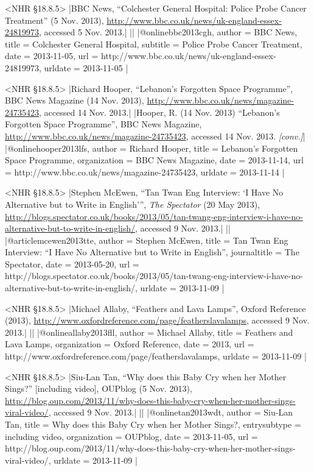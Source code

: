 \documentclass[extrafontsizes,11pt,a4paper,oneside]{memoir}
\begin{document}
\bibexample<NHR \S18.8.5>
|BBC News, \enquote{Colchester General Hospital: Police Probe Cancer Treatment} (5 Nov. 2013), \url{http://www.bbc.co.uk/news/uk-england-essex-24819973}, accessed 5 Nov. 2013.|%
||%
|@online{bbc2013cgh,
  author = {{BBC News}},
  title = {Colchester General Hospital},
  subtitle = {Police Probe Cancer Treatment},
  date = {2013-11-05},
  url = {http://www.bbc.co.uk/news/uk-england-essex-24819973},
  urldate = {2013-11-05}
}|

\bibexample<NHR \S18.8.5>
|Richard Hooper, \enquote{Lebanon's Forgotten Space Programme}, BBC News Magazine (14 Nov. 2013), \url{http://www.bbc.co.uk/news/magazine-24735423}, accessed 14 Nov. 2013.|%
|Hooper, R. (14 Nov. 2013) \enquote{Lebanon's Forgotten Space Programme}, BBC News Magazine, \url{http://www.bbc.co.uk/news/magazine-24735423}, accessed 14 Nov. 2013. \emph{[conv.]}|%
|@online{hooper2013lfs,
  author = {Richard Hooper},
  title = {Lebanon's Forgotten Space Programme},
  organization = {BBC News Magazine},
  date = {2013-11-14},
  url = {http://www.bbc.co.uk/news/magazine-24735423},
  urldate = {2013-11-14}
}|

\bibexample<NHR \S18.8.5>
|Stephen McEwen, \enquote{Tan Twan Eng Interview: \enquote{I Have No Alternative but to Write in English}}, \emph{The Spectator} (20 May 2013), \url{http://blogs.spectator.co.uk/books/2013/05/tan-twang-eng-interview-i-have-no-alternative-but-to-write-in-english/}, accessed 9 Nov. 2013.|%
||%
|@article{mcewen2013tte,
  author = {Stephen McEwen},
  title = {Tan Twan Eng Interview: \enquote{I Have No Alternative but to Write in English}},
  journaltitle = {The Spectator},
  date = {2013-05-20},
  url = {http://blogs.spectator.co.uk/books/2013/05/tan-twang-eng-interview-i-have-no-alternative-but-to-write-in-english/},
  urldate = {2013-11-09}
}|

\bibexample<NHR \S18.8.5>
|Michael Allaby, \enquote{Feathers and Lava Lamps}, Oxford Reference (2013), \url{http://www.oxfordreference.com/page/featherslavalamps}, accessed 9 Nov. 2013.|%
||%
|@online{allaby2013fll,
  author = {Michael Allaby},
  title = {Feathers and Lava Lamps},
  organization = {Oxford Reference},
  date = {2013},
  url = {http://www.oxfordreference.com/page/featherslavalamps},
  urldate = {2013-11-09}
}|

\bibexample<NHR \S18.8.5>
|Siu-Lan Tan, \enquote{Why does this Baby Cry when her Mother Sings?} [including video], OUPblog (5 Nov. 2013), \url{http://blog.oup.com/2013/11/why-does-this-baby-cry-when-her-mother-sings-viral-video/}, accessed 9 Nov. 2013.|%
||%
|@online{tan2013wdt,
  author = {Siu-Lan Tan},
  title = {Why does this Baby Cry when her Mother Sings?},
  entrysubtype = {including video},
  organization = {OUPblog},
  date = {2013-11-05},
  url = {http://blog.oup.com/2013/11/why-does-this-baby-cry-when-her-mother-sings-viral-video/},
  urldate = {2013-11-09}
}|
\end{document}
